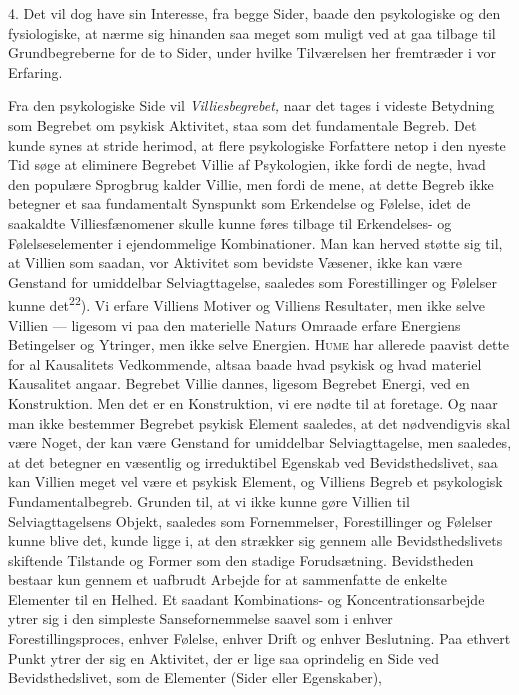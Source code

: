 \documentclass[12pt,a4paper,openany]{book}
\newcommand{\opage}[1]{\marginnote{\footnotesize\textit{[#1]}}}
\begin{document}
4. Det vil dog have sin Interesse, fra begge Sider, baade den psykologiske og
den fysiologiske, at nærme sig hinanden saa meget som muligt ved at gaa tilbage
til Grundbegreberne for de to Sider, under hvilke Tilværelsen her fremtræder i
vor Erfaring.

Fra den psykologiske Side vil \textit{Villiesbegrebet,} naar det tages i
videste Betydning som Begrebet om psykisk Aktivitet, staa som det fundamentale
Begreb. Det kunde synes at stride herimod, at flere psykologiske Forfattere
netop i den nyeste Tid søge at eliminere Begrebet Villie af Psykologien, ikke
fordi de negte, hvad den populære Sprogbrug kalder Villie, men fordi de mene,
at dette Begreb ikke betegner et saa fundamentalt Synspunkt som Erkendelse og
Følelse, idet de saakaldte Villiesfænomener skulle kunne føres tilbage til
Erkendelses- og Følelseselementer i ejendommelige Kombinationer. Man kan herved
\opage{26}støtte sig til, at Villien som saadan, vor Aktivitet som bevidste
Væsener, ikke kan være Genstand for umiddelbar Selviagttagelse, saaledes som
Forestillinger og Følelser kunne det\textsuperscript{22}). Vi erfare Villiens
Motiver og Villiens Resultater, men ikke selve Villien --- ligesom vi paa den
materielle Naturs Omraade erfare Energiens Betingelser og Ytringer, men ikke
selve Energien. \textsc{Hume} har allerede paavist dette for al Kausalitets
Vedkommende, altsaa baade hvad psykisk og hvad materiel Kausalitet angaar.
Begrebet Villie dannes, ligesom Begrebet Energi, ved en Konstruktion. Men det
er en Konstruktion, vi ere nødte til at foretage. Og naar man ikke bestemmer
Begrebet psykisk Element saaledes, at det nødvendigvis skal være Noget, der kan
være Genstand for umiddelbar Selviagttagelse, men saaledes, at det betegner en
væsentlig og irreduktibel Egenskab ved Bevidsthedslivet, saa kan Villien meget
vel være et psykisk Element, og Villiens Begreb et psykologisk
Fundamentalbegreb. Grunden til, at vi ikke kunne gøre Villien til
Selviagttagelsens Objekt, saaledes som Fornemmelser, Forestillinger og Følelser
kunne blive det, kunde ligge i, at den strækker sig gennem alle
Bevidsthedslivets skiftende Tilstande og Former som den stadige Forudsætning.
Bevidstheden bestaar kun gennem et uafbrudt Arbejde for at sammenfatte de
enkelte Elementer til en Helhed. Et saadant Kombinations- og
Koncentrationsarbejde ytrer sig i den simpleste Sansefornemmelse saavel som i
enhver Forestillingsproces, enhver Følelse, enhver Drift og enhver Beslutning.
Paa ethvert Punkt ytrer der sig en Aktivitet, der er lige saa oprindelig en
Side ved Bevidsthedslivet, som de Elementer (Sider eller Egenskaber),
\end{document}
